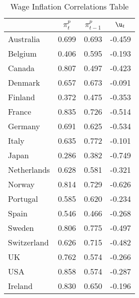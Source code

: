 \begin{table}[htbp]
\caption{\label{clabel} Wage Inflation Correlations Table}\centering\medskip
\begin{tabular}{lccc} \hline \hline
 & $\pi_t^p$  & $\pi_{t-1}^p$  & $\u_t$  \\  \hline 
Australia &     0.699 &     0.693 &    -0.459 \\  
Belgium &     0.406 &     0.595 &    -0.193 \\  
Canada &     0.807 &     0.497 &    -0.423 \\  
Denmark &     0.657 &     0.673 &    -0.091 \\  
Finland &     0.372 &     0.475 &    -0.353 \\  
France &     0.835 &     0.726 &    -0.514 \\  
Germany &     0.691 &     0.625 &    -0.534 \\  
Italy &     0.635 &     0.772 &    -0.101 \\  
Japan &     0.286 &     0.382 &    -0.749 \\  
Netherlands &     0.628 &     0.581 &    -0.321 \\  
Norway &     0.814 &     0.729 &    -0.626 \\  
Portugal &     0.585 &     0.620 &    -0.234 \\  
Spain &     0.546 &     0.466 &    -0.268 \\  
Sweden &     0.806 &     0.775 &    -0.497 \\  
Switzerland &     0.626 &     0.715 &    -0.482 \\  
UK &     0.762 &     0.574 &    -0.266 \\  
USA &     0.858 &     0.574 &    -0.287 \\  
Ireland &     0.830 &     0.650 &    -0.196 \\  
\hline \hline \end{tabular}
\end{table}
